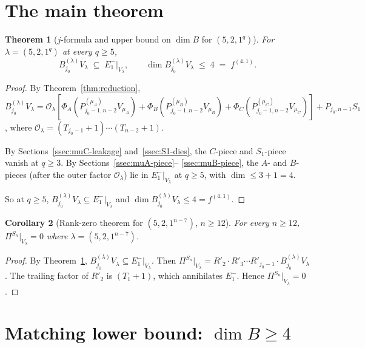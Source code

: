 \documentclass[11pt]{article}
\newtheorem{theorem}{Theorem}
\newtheorem{corollary}[theorem]{Corollary}
\theoremstyle{definition}
\begin{document}
\section{The main theorem}\label{sec:main}

\begin{theorem}[$j$-formula and upper bound on $\dim B$ for $(5, 2, 1^q)$]
\label{thm:main}
For $\lambda = (5, 2, 1^q)$ at every $q \ge 5$,
\[
   B^{(\lambda)}_{j_0} V_\lambda \;\subseteq\; E_1^-|_{V_\lambda},
   \qquad
   \dim B^{(\lambda)}_{j_0} V_\lambda \;\le\; 4 \;=\; f^{(4, 1)}.
\]
\end{theorem}

\begin{proof}
By Theorem~\ref{thm:reduction},
$B^{(\lambda)}_{j_0} V_\lambda = \mathcal{O}_\lambda
[\Phi_A(P^{(\mu_A)}_{j_0-1, n-2} V_{\mu_A}) + \Phi_B(P^{(\mu_B)}_{j_0-1, n-2}
V_{\mu_B}) + \Phi_C(P^{(\mu_C)}_{j_0-1, n-2} V_{\mu_C})] +
P_{j_0, n-1} S_1$, where $\mathcal{O}_\lambda = (T_{j_0-1}{+}1)\cdots
(T_{n-2}{+}1)$.

By Sections~\ref{ssec:muC-leakage} and~\ref{ssec:S1-dies}, the $C$-piece
and $S_1$-piece vanish at $q \ge 3$. By Sections~\ref{ssec:muA-piece}--%
\ref{ssec:muB-piece}, the $A$- and $B$-pieces (after the outer factor
$\mathcal{O}_\lambda$) lie in $E_1^-|_{V_\lambda}$ at $q \ge 5$, with
$\dim \le 3 + 1 = 4$.

So at $q \ge 5$, $B^{(\lambda)}_{j_0} V_\lambda \subseteq E_1^-|_{V_\lambda}$
and $\dim B^{(\lambda)}_{j_0} V_\lambda \le 4 = f^{(4,1)}$.
\end{proof}

\begin{corollary}[Rank-zero theorem for $(5, 2, 1^{n-7})$, $n \ge 12$]
\label{cor:rank-zero}
For every $n \ge 12$, $\Pi^{S_n}|_{V_\lambda} = 0$ where
$\lambda = (5, 2, 1^{n-7})$.
\end{corollary}

\begin{proof}
By Theorem~\ref{thm:main}, $B^{(\lambda)}_{j_0} V_\lambda \subseteq
E_1^-|_{V_\lambda}$. Then $\Pi^{S_n}|_{V_\lambda} = R'_2 \cdot R'_3 \cdots
R'_{j_0 - 1} \cdot B^{(\lambda)}_{j_0} V_\lambda$. The trailing factor
of $R'_2$ is $(T_1 + 1)$, which annihilates $E_1^-$. Hence
$\Pi^{S_n}|_{V_\lambda} = 0$.
\end{proof}

\section{Matching lower bound: $\dim B \ge 4$}\label{sec:LB}
\end{document}
